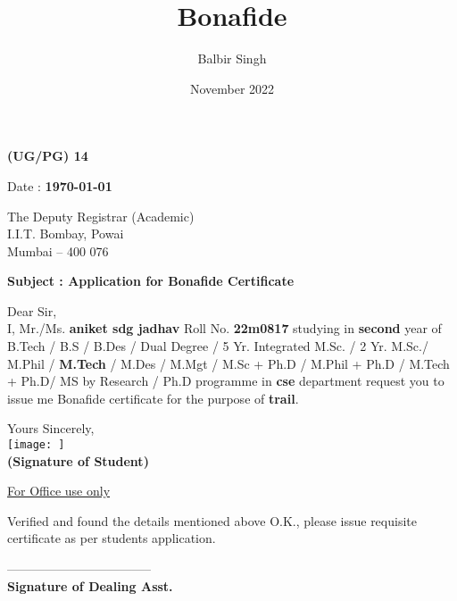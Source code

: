 \documentclass[12pt]{article}
\title{Bonafide}
\author{Balbir Singh}
\date{November 2022}
\begin{document}
\begin{center}
    \Large{\textbf{(UG/PG) 14}}
\end{center}

  
\begin{flushright}
    Date : \textbf{\today}
\end{flushright}          
The Deputy Registrar (Academic)\\
I.I.T. Bombay, Powai\\
Mumbai – 400 076\\
\vspace{0.8cm}

\begin{center}
    \textbf{Subject : Application for Bonafide Certificate}
\end{center}
\vspace{0.4cm}
Dear Sir,\\

\hspace{1.5cm}I,   Mr./Ms.\textbf{ aniket sdg jadhav } Roll   No. \textbf{ 22m0817 }
studying in \textbf{ second }  year of B.Tech / B.S / B.Des / Dual Degree / 5 Yr. Integrated M.Sc. / 2 Yr. M.Sc./ 
M.Phil / \textbf{M.Tech} / M.Des / M.Mgt / M.Sc + Ph.D / M.Phil + Ph.D / M.Tech + Ph.D/ MS by Research / Ph.D
programme in    \textbf{ cse }  department request you to issue me Bonafide certificate for the
purpose of \textbf{ trail}.\\
\begin{flushright}
    Yours Sincerely, \\     \vspace{0.5cm}
    \texttt{[image: ]}\\
\textbf{(Signature of Student)} 
\end{flushright}

\vspace{1cm}

\hline
\begin{center}
    \underline{For Office use only}
\end{center}

Verified and found the details mentioned above O.K.,   please issue requisite certificate as per
students application.

\vspace{2cm}
\begin{flushright}
    -----------------------------------\\
   \textbf{Signature of  Dealing Asst.} 
\end{flushright}
\end{document}
